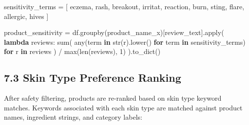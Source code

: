 \documentclass[
  letterpaper,
  DIV=11,
  numbers=noendperiod]{scrartcl}
\newenvironment{Shaded}{\begin{snugshade}}{\end{snugshade}}
\newcommand{\BuiltInTok}[1]{\textcolor[rgb]{0.00,0.23,0.31}{#1}}
\newcommand{\ControlFlowTok}[1]{\textcolor[rgb]{0.00,0.23,0.31}{\textbf{#1}}}
\newcommand{\DecValTok}[1]{\textcolor[rgb]{0.68,0.00,0.00}{#1}}
\newcommand{\KeywordTok}[1]{\textcolor[rgb]{0.00,0.23,0.31}{\textbf{#1}}}
\newcommand{\NormalTok}[1]{\textcolor[rgb]{0.00,0.23,0.31}{#1}}
\newcommand{\OperatorTok}[1]{\textcolor[rgb]{0.37,0.37,0.37}{#1}}
\newcommand{\StringTok}[1]{\textcolor[rgb]{0.13,0.47,0.30}{#1}}
\begin{document}
\protect{}\label{code-sensitivity}
\begin{Shaded}
\begin{Highlighting}[]
\NormalTok{sensitivity\_terms }\OperatorTok{=}\NormalTok{ [}
    \StringTok{\textquotesingle{}eczema\textquotesingle{}}\NormalTok{, }\StringTok{\textquotesingle{}rash\textquotesingle{}}\NormalTok{, }\StringTok{\textquotesingle{}breakout\textquotesingle{}}\NormalTok{, }\StringTok{\textquotesingle{}irritat\textquotesingle{}}\NormalTok{, }\StringTok{\textquotesingle{}reaction\textquotesingle{}}\NormalTok{,}
    \StringTok{\textquotesingle{}burn\textquotesingle{}}\NormalTok{, }\StringTok{\textquotesingle{}sting\textquotesingle{}}\NormalTok{, }\StringTok{\textquotesingle{}flare\textquotesingle{}}\NormalTok{, }\StringTok{\textquotesingle{}allergic\textquotesingle{}}\NormalTok{, }\StringTok{\textquotesingle{}hives\textquotesingle{}}
\NormalTok{]}

\NormalTok{product\_sensitivity }\OperatorTok{=}\NormalTok{ df.groupby(}\StringTok{\textquotesingle{}product\_name\_x\textquotesingle{}}\NormalTok{)[}\StringTok{\textquotesingle{}review\_text\textquotesingle{}}\NormalTok{].}\BuiltInTok{apply}\NormalTok{(}
    \KeywordTok{lambda}\NormalTok{ reviews: }\BuiltInTok{sum}\NormalTok{(}
        \BuiltInTok{any}\NormalTok{(term }\KeywordTok{in} \BuiltInTok{str}\NormalTok{(r).lower() }\ControlFlowTok{for}\NormalTok{ term }\KeywordTok{in}\NormalTok{ sensitivity\_terms)}
        \ControlFlowTok{for}\NormalTok{ r }\KeywordTok{in}\NormalTok{ reviews}
\NormalTok{    ) }\OperatorTok{/} \BuiltInTok{max}\NormalTok{(}\BuiltInTok{len}\NormalTok{(reviews), }\DecValTok{1}\NormalTok{)}
\NormalTok{).to\_dict()}
\end{Highlighting}
\end{Shaded}

\subsection{7.3 Skin Type Preference
Ranking}\label{skin-type-preference-ranking}

After safety filtering, products are re-ranked based on skin type
keyword matches. Keywords associated with each skin type are matched
against product names, ingredient strings, and category labels:
\end{document}
